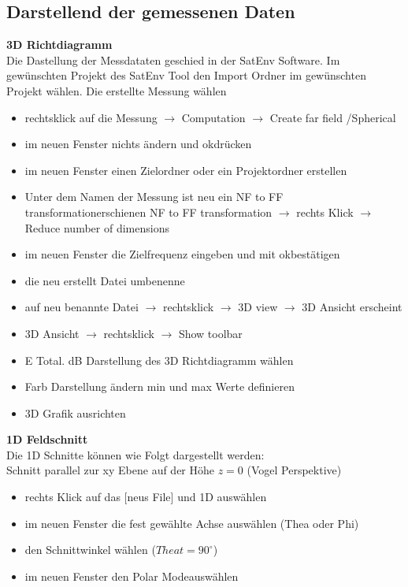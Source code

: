 \begin{itemize}
	\subsection{Darstellend der gemessenen Daten}
	\textbf{3D Richtdiagramm}\\
	Die Dastellung der Messdataten geschied in der SatEnv Software.  Im gewünschten Projekt des SatEnv Tool den Import Ordner im gewünschten Projekt wählen. Die erstellte Messung wählen
	\begin{itemize}
	\item rechtsklick auf die Messung $\rightarrow$ Computation $\rightarrow$ Create far field /Spherical 
	\item im neuen Fenster nichts ändern und \glqq ok\grqq drücken
	\item im neuen Fenster einen Zielordner  oder ein Projektordner erstellen
	\item Unter dem Namen der Messung ist neu ein \glqq NF to FF transformation\grqq erschienen
	 \glqq NF to FF transformation  \grqq $\rightarrow$ rechts Klick $\rightarrow$ Reduce number of dimensions
	\item  im neuen Fenster die Zielfrequenz eingeben und mit \glqq ok\grqq bestätigen
	\item  die neu erstellt Datei umbenenne 
	\item auf neu benannte Datei $\rightarrow$ rechtsklick $\rightarrow$ 3D view $\rightarrow$ 3D Ansicht erscheint 
	\item 3D Ansicht $\rightarrow$ rechtsklick $\rightarrow$ Show toolbar 
	\item E Total. dB Darstellung des 3D Richtdiagramm wählen
	\item Farb Darstellung ändern \glqq min \grqq und \glqq max \grqq Werte definieren
	\item 3D Grafik ausrichten
	\end{itemize}
	\textbf{1D Feldschnitt}\\
	Die 1D Schnitte können wie Folgt dargestellt werden:\\
	Schnitt parallel zur xy Ebene auf der Höhe $z=0$ (Vogel Perspektive)
	\begin{itemize}
	\item rechts Klick auf das [neus File]  und \glqq 1D \grqq auswählen
	\item im neuen Fenster die fest gewählte Achse auswählen (Thea oder Phi)
	\item den Schnittwinkel wählen ($Theat = 90^\circ$)
	\item im neuen Fenster den \glqq Polar Mode\grqq auswählen

\end{itemize}
\end{itemize}
